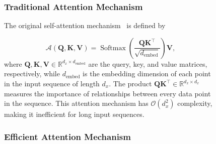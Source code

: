\begin{figure}[!htbp]
{%



\subsubsection{Traditional Attention Mechanism}

The original self-attention mechanism~\cite{vaswani2017attention} is defined by

\begin{equation}
\mathcal{A}(\mathbf{Q}, \mathbf{K}, \mathbf{V}) = \operatorname{Softmax}\left(\frac{\mathbf{QK}^\top}{\sqrt{d_{\text{embed}}}}\right) \mathbf{V},
\end{equation}
where $\mathbf{Q}, \mathbf{K}, \mathbf{V} \in \mathbb{R}^{d_x \times d_{\text{embed}}}$ are the query, key, and value matrices, respectively, while $d_{\text{embed}}$ is the embedding dimension of each point in the input sequence of length $d_x$. The product $\mathbf{QK}^\top \in \mathbb{R}^{d_x \times d_x}$ measures the importance of relationships between every data point in the sequence. This attention mechanism has $\mathcal{O}(d_x^2)$ complexity, making it inefficient for long input sequences.


\subsubsection{Efficient Attention Mechanism}

}
\end{figure}
